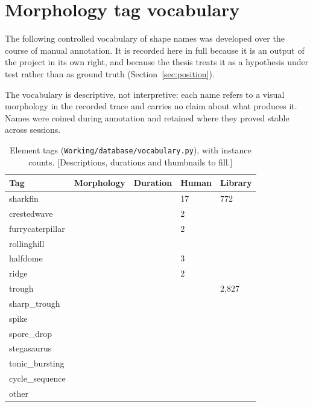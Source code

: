 \chapter{Morphology tag vocabulary}
\label{app:vocab}

The following controlled vocabulary of shape names was developed over the course of manual annotation. It is recorded here in full because it is an output of the project in its own right, and because the thesis treats it as a hypothesis under test rather than as ground truth (Section~\ref{sec:position}).

The vocabulary is descriptive, not interpretive: each name refers to a visual morphology in the recorded trace and carries no claim about what produces it. Names were coined during annotation and retained where they proved stable across sessions.

\begin{table}[htbp]
\caption[{Element tags, with instance counts.}]{Element tags (\texttt{Working/database/vocabulary.py}), with instance counts. [Descriptions, durations and thumbnails to fill.]}
\label{tab:vocab}
\small
\begin{tabularx}{\textwidth}{p{3.0cm} X p{1.6cm} p{1.4cm} p{1.4cm}}
\toprule
\textbf{Tag} & \textbf{Morphology} & \textbf{Duration} & \textbf{Human} & \textbf{Library}\\
\midrule
sharkfin & & & 17 & 772\\
crestedwave & & & 2 & \\
furrycaterpillar & & & 2 & \\
rollinghill & & & & \\
halfdome & & & 3 & \\
ridge & & & 2 & \\
trough & & & & 2,827\\
sharp\_trough & & & & \\
spike & & & & \\
spore\_drop & & & & \\
stegasaurus & & & & \\
tonic\_bursting & & & & \\
cycle\_sequence & & & & \\
other & & & & \\
\bottomrule
\end{tabularx}
\end{table}

